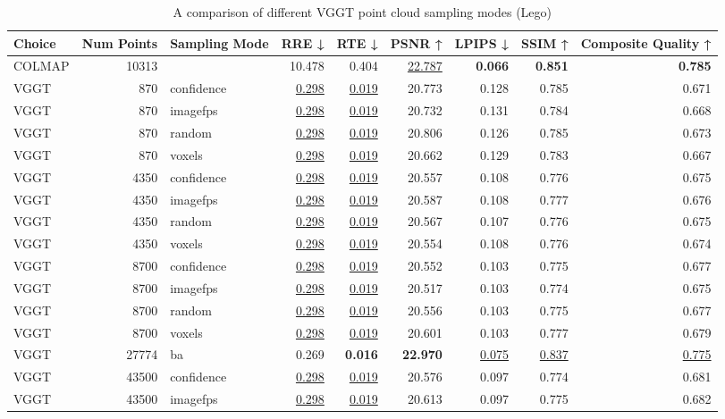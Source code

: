 \begin{table}[H]
\caption{\ifdefined\customcaption \customcaption \else A comparison of different VGGT point cloud sampling modes (Lego) \fi}
\label{tab:03_sampling_mode_lego}
\centering
\scriptsize
\begin{tabular}{lrlrrrrrr}
\toprule
Choice & Num Points & Sampling Mode & RRE ↓ & RTE ↓ & PSNR ↑ & LPIPS ↓ & SSIM ↑ & Composite Quality ↑ \\
\midrule
COLMAP & 10313 &  & 10.478 & 0.404 & \underline{22.787} & \textbf{0.066} & \textbf{0.851} & \textbf{0.785} \\
VGGT & 870 & confidence & \underline{0.298} & \underline{0.019} & 20.773 & 0.128 & 0.785 & 0.671 \\
VGGT & 870 & imagefps & \underline{0.298} & \underline{0.019} & 20.732 & 0.131 & 0.784 & 0.668 \\
VGGT & 870 & random & \underline{0.298} & \underline{0.019} & 20.806 & 0.126 & 0.785 & 0.673 \\
VGGT & 870 & voxels & \underline{0.298} & \underline{0.019} & 20.662 & 0.129 & 0.783 & 0.667 \\
VGGT & 4350 & confidence & \underline{0.298} & \underline{0.019} & 20.557 & 0.108 & 0.776 & 0.675 \\
VGGT & 4350 & imagefps & \underline{0.298} & \underline{0.019} & 20.587 & 0.108 & 0.777 & 0.676 \\
VGGT & 4350 & random & \underline{0.298} & \underline{0.019} & 20.567 & 0.107 & 0.776 & 0.675 \\
VGGT & 4350 & voxels & \underline{0.298} & \underline{0.019} & 20.554 & 0.108 & 0.776 & 0.674 \\
VGGT & 8700 & confidence & \underline{0.298} & \underline{0.019} & 20.552 & 0.103 & 0.775 & 0.677 \\
VGGT & 8700 & imagefps & \underline{0.298} & \underline{0.019} & 20.517 & 0.103 & 0.774 & 0.675 \\
VGGT & 8700 & random & \underline{0.298} & \underline{0.019} & 20.556 & 0.103 & 0.775 & 0.677 \\
VGGT & 8700 & voxels & \underline{0.298} & \underline{0.019} & 20.601 & 0.103 & 0.777 & 0.679 \\
VGGT & 27774 & ba & 0.269 & \textbf{0.016} & \textbf{22.970} & \underline{0.075} & \underline{0.837} & \underline{0.775} \\
VGGT & 43500 & confidence & \underline{0.298} & \underline{0.019} & 20.576 & 0.097 & 0.774 & 0.681 \\
VGGT & 43500 & imagefps & \underline{0.298} & \underline{0.019} & 20.613 & 0.097 & 0.775 & 0.682 \\

\end{tabular}
\end{table}
